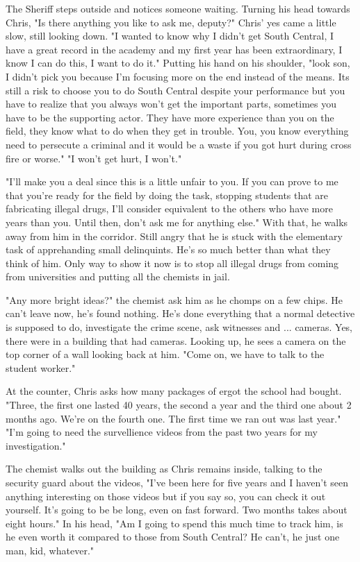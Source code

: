         The Sheriff steps outside and notices someone waiting. Turning his head towards Chris, "Is there anything you like to ask me, deputy?"
    Chris' yes came a little slow, still looking down. "I wanted to know why I didn't get South Central, I have a great record in the academy
    and my first year has been extraordinary, I know I can do this, I want to do it." Putting his hand on his shoulder, "look son, I didn't pick
    you because I'm focusing more on the end instead of the means. Its still a risk to choose you to do South Central despite your performance
    but you have to realize that you always won't get the important parts, sometimes you have to be the supporting actor. They have more 
    experience than you on the field, they know what to do when they get in trouble. You, you know everything need to persecute a criminal and
    it would be a waste if you got hurt during cross fire or worse." "I won't get hurt, I won't."

        "I'll make you a deal since this is a little unfair to you. If you can prove to me that you're ready for the field by doing the task, 
    stopping students that are fabricating illegal drugs, I'll consider equivalent to the others who have more years than you. Until then, don't
    ask me for anything else." With that, he walks away from him in the corridor. Still angry that he is stuck with the elementary task of 
    apprehanding small delinquints. He's so much better than what they think of him. Only way to show it now is to stop all illegal drugs from
    coming from universities and putting all the chemists in jail.

        "Any more bright ideas?" the chemist ask him as he chomps on a few chips. He can't leave now, he's found nothing. He's done everything
    that a normal detective is supposed to do, investigate the crime scene, ask witnesses and ... cameras. Yes, there were in a building that had
    cameras. Looking up, he sees a camera on the top corner of a wall looking back at him. "Come on, we have to talk to the student worker."

        At the counter, Chris asks how many packages of ergot the school had bought. "Three, the first one lasted 40 years, the second a year and
    the third one about 2 months ago. We're on the fourth one. The first time we ran out was last year." "I'm going to need the survellience 
    videos from the past two years for my investigation."

        The chemist walks out the building as Chris remains inside, talking to the security guard about the videos, "I've been here for five years
    and I haven't seen anything interesting on those videos but if you say so, you can check it out yourself. It's going to be be long, even
    on fast forward. Two months takes about eight hours." In his head, "Am I going to spend this much time to track him, is he even worth it
    compared to those from South Central? He can't, he just one man, kid, whatever."

